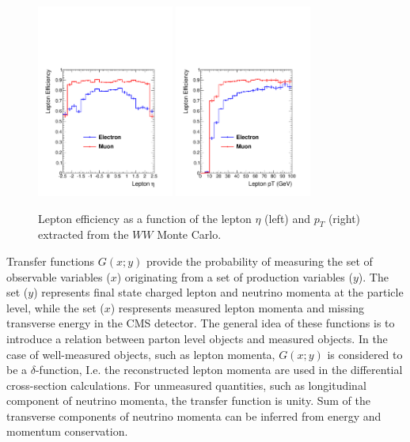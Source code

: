 \documentclass{cmspaper}
\begin{document}
\begin{figure}[!htbp]
\begin{center}
\includegraphics[width=0.4\textwidth]{figures/lepton_eff_Eta.pdf}
\includegraphics[width=0.4\textwidth]{figures/lepton_eff_Pt.pdf}\\
\caption{Lepton efficiency as a function of the lepton $\eta$ (left) and $p_{T}$ (right) extracted 
from the $WW$ Monte Carlo.}
\label{fig:lepeff_gen}
\end{center}
\end{figure}

Transfer functions $G(x;y)$ provide the probability of measuring the set of observable variables ($x$) originating 
from a set of production variables ($y$). The set ($y$) represents final state charged lepton and neutrino momenta at
the particle level, while the set ($x$) respresents measured lepton momenta and missing transverse energy in the CMS
detector. The general idea of these  functions is to introduce a relation between parton level objects and measured objects.
In the case of well-measured objects, such as lepton momenta, $G(x;y)$ is considered to be a $\delta$-function, I.e. the 
reconstructed lepton momenta are used in the differential cross-section calculations. For unmeasured quantities, such as
longitudinal component of neutrino momenta, the transfer function is unity. Sum of the transverse components of neutrino
momenta can be inferred from energy and momentum conservation.
\end{document}
